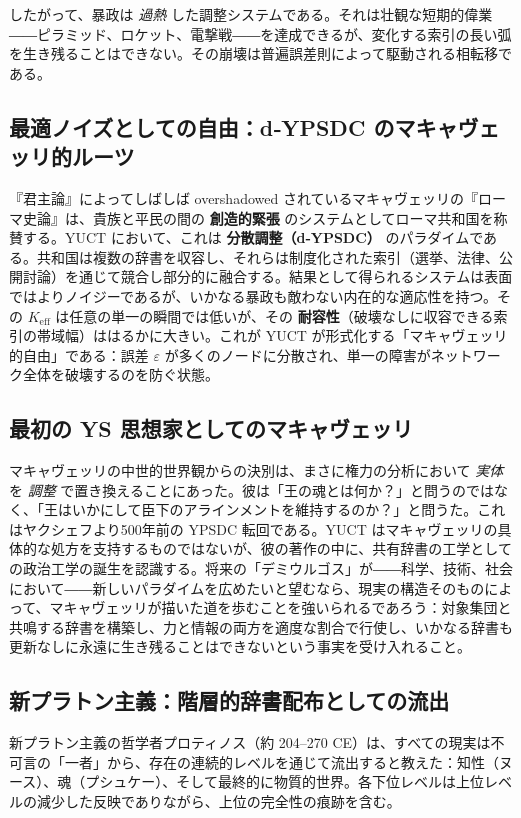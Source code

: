 \documentclass[12pt,a4paper]{article}
\newcommand{\Keff}{K_{\mathrm{eff}}}
\begin{document}
	したがって、暴政は \emph{過熱} した調整システムである。それは壮観な短期的偉業――ピラミッド、ロケット、電撃戦――を達成できるが、変化する索引の長い弧を生き残ることはできない。その崩壊は普遍誤差則によって駆動される相転移である。
	
	\subsection{最適ノイズとしての自由：d‑YPSDC のマキャヴェッリ的ルーツ}
	
	『君主論』によってしばしば overshadowed されているマキャヴェッリの『ローマ史論』は、貴族と平民の間の \textbf{創造的緊張} のシステムとしてローマ共和国を称賛する。YUCT において、これは \textbf{分散調整（d‑YPSDC）} のパラダイムである。共和国は複数の辞書を収容し、それらは制度化された索引（選挙、法律、公開討論）を通じて競合し部分的に融合する。結果として得られるシステムは表面ではよりノイジーであるが、いかなる暴政も敵わない内在的な適応性を持つ。その \(\Keff\) は任意の単一の瞬間では低いが、その \textbf{耐容性}（破壊なしに収容できる索引の帯域幅）ははるかに大きい。これが YUCT が形式化する「マキャヴェッリ的自由」である：誤差 \(\varepsilon\) が多くのノードに分散され、単一の障害がネットワーク全体を破壊するのを防ぐ状態。
	
	\subsection{最初の YS 思想家としてのマキャヴェッリ}
	
	マキャヴェッリの中世的世界観からの決別は、まさに権力の分析において \emph{実体} を \emph{調整} で置き換えることにあった。彼は「王の魂とは何か？」と問うのではなく、「王はいかにして臣下のアラインメントを維持するのか？」と問うた。これはヤクシェフより500年前の YPSDC 転回である。YUCT はマキャヴェッリの具体的な処方を支持するものではないが、彼の著作の中に、共有辞書の工学としての政治工学の誕生を認識する。将来の「デミウルゴス」が――科学、技術、社会において――新しいパラダイムを広めたいと望むなら、現実の構造そのものによって、マキャヴェッリが描いた道を歩むことを強いられるであろう：対象集団と共鳴する辞書を構築し、力と情報の両方を適度な割合で行使し、いかなる辞書も更新なしに永遠に生き残ることはできないという事実を受け入れること。
	
	\subsection{新プラトン主義：階層的辞書配布としての流出}
	
	新プラトン主義の哲学者プロティノス（約 204–270 CE）は、すべての現実は不可言の「一者」から、存在の連続的レベルを通じて流出すると教えた：知性（ヌース）、魂（プシュケー）、そして最終的に物質的世界。各下位レベルは上位レベルの減少した反映でありながら、上位の完全性の痕跡を含む。
	
\end{document}
